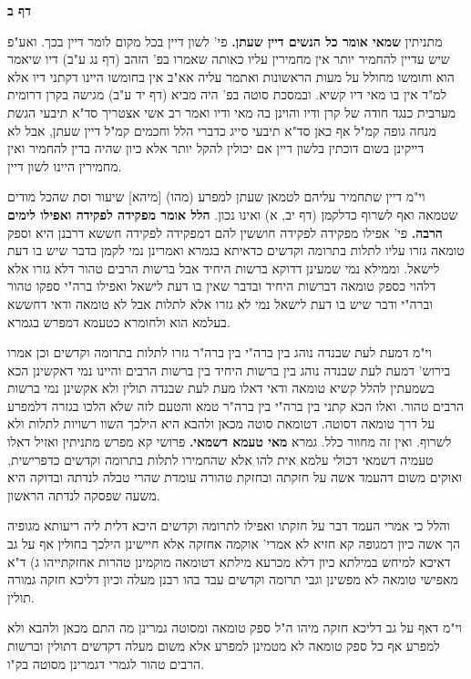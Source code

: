 \documentclass[12pt, openany]{book}
\newcommand{\sethebfont}{
\fontsize{10.5pt}{21.0pt} \selectfont
}
\newcommand{\twocol}[1]{
	{\sethebfont \begin{multicols}{2}
			#1
	\end{multicols}}	
}
\newcommand{\sectname}{}
\newcommand{\newsection}[1]{
	\renewcommand{\sectname}{#1}	
	\vspace{-\baselineskip}
	\begin{center}
		\textbf{%
\fontsize{16pt}{16pt}\selectfont
			#1}
	\end{center}
	\vspace{-\baselineskip}
	\nopagebreak
}
\begin{document}
{\newsection{דף ב}
\twocol{מתניתין \textbf{שמאי אומר כל הנשים דיין שעתן.} פי' לשון דיין בכל מקום לומר דיין בכך. ואע"פ שיש עדיין להחמיר יותר אין מחמירין עליו כאותה שאמרו בפ' הזהב (דף נג ע"ב) דיו שיאמר הוא וחומשו מחולל על מעות הראשונות ואתמר עליה אא"ב אין בחומשו היינו דקתני דיו אלא למ"ד אין בו מאי דיו קשיא. ובמסכת סוטה בפ' היה מביא (דף יד ע"ב) מגישה בקרן דרומית מערבית כנגד חודה של קרן ודיו והוינן בה מאי ודיו ואמר רב אשי אצטריך סד"א תיבעי הגשת מנחה גופה קמ"ל אף כאן סד"א תיבעי סייג כדברי הלל וחכמים קמ"ל דיין שעתן, אבל לא דייקינן בשום דוכתין בלשון דיין אם יכולין להקל יותר אלא כיון שהיה בדין להחמיר ואין מחמירין היינו לשון דיין.\par וי"מ דיין שתחמיר עליהם לטמאן שעתן למפרע (מהו) [מיהא] שיעור וסת שהכל מודים שטמאה ואף לשרוף כדלקמן (דף יב, א) ואינו נכון. 
\textbf{הלל אומר מפקידה לפקידה ואפילו לימים הרבה.} פי' אפילו מפקידה לפקידה חוששין להם דמפקידה לפקידה חששא דרבנן היא וספק טומאה גזרו עליו לתלות בתרומה וקדשים כדאיתא בגמרא ואמרינן נמי לקמן בדבר שיש בו דעת לישאל. וממילא נמי שמעינן דדוקא ברשות היחיד אבל ברשות הרבים טהור דלא גזרו אלא דלהוי כספק טומאה דברשות היחיד ובדבר שאין בו דעת לישאל ואפילו ברה"י ספקו טהור וברה"י ודבר שיש בו דעת לישאל נמי לא גזרו אלא לתלות אבל לא טומאה ודאי דחששא בעלמא הוא ולחומרא כטעמא דמפרש בגמרא.\par וי"מ דמעת לעת שבנדה נוהג בין ברה"י בין ברה"ר גזרו לתלות בתרומה וקדשים וכן אמרו בירוש' דמעת לעת שבנדה נוהג בין ברשות היחיד בין ברשות הרבים והיינו נמי דאקשינן הכא בשמעתין להלל קשיא טומאה ודאי דאלו מעת לעת שבנדה תולין ולא אקשינן נמי ברשות הרבים טהור. ואלו הכא קתני בין ברה"י בין ברה"ר טמא והטעם לזה שלא הלכו בגזרה דלמפרע על דרך טומאה דסוטה. דטומאת סוטה מכאן ולהבא היא הילכך השוו רשויות לתלות ולא לשרוף. ואין זה מחוור כלל. 
גמרא \textbf{מאי טעמא דשמאי.} פרושי קא מפרש מתניתין ואזיל דאלו טעמיה דשמאי דכולי עלמא אית להו אלא שהחמירו לתלות בתרומה וקדשים כדפרישית, ואוקים משום דהעמד אשה על חזקתה ובחזקת טהורה עומדת שהרי טבלה לנדתה ובדוקה היא משעה שפסקה לנדתה הראשון.\par והלל כי אמרי העמד דבר על חזקתו ואפילו לתרומה וקדשים היכא דלית ליה ריעותא מגופיה הך אשה כיון דמגופה קא חזיא לא אמרי' אוקמה אחזקה אלא חיישינן הילכך בחולין אף על גב דאיכא למיחש במילתא כיון דלא מכרעא מילתא דטומאה מוקמינן טהרות אחזקתייהו ג) ד"א מאפישי טומאה לא מפשינן וגבי תרומה וקדשים עבד בהו רבנן מעלה וכיון דליכא חזקה גמורה תולין.\par וי"מ דאף על גב דליכא חזקה מיהו ה"ל ספק טומאה ומסוטה גמרינן מה התם מכאן ולהבא ולא למפרע אף כל ספק טומאה לא מטמינן למפרע אלא משום מעלה דקדשים דתולין וברשות הרבים טהור לגמרי דגמרינן מסוטה בק"ו. 
}}
\end{document}
